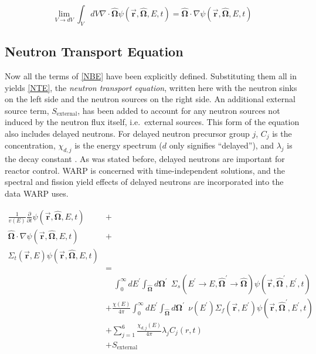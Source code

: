 \begin{equation}
\label{streaming}
 \lim_{V\to dV} \int_V dV \nabla \cdot \boldsymbol{\hat{\Omega}}  \psi(\boldsymbol{\vec{r}},\boldsymbol{\hat{\Omega}},E,t) =  \boldsymbol{\hat{\Omega}}  \cdot \nabla\psi(\boldsymbol{\vec{r}},\boldsymbol{\hat{\Omega}},E,t) 
 \end{equation}
 

\subsection{Neutron Transport Equation}

Now all the terms of \eqref{NBE} have been explicitly defined.  Substituting them all in yields \eqref{NTE}, the \emph{neutron transport equation}, written here with the neutron sinks on the left side and the neutron sources on the right side.  An additional external source term, $S_{\mathrm{external}}$, has been added to account for any neutron sources not induced by the neutron flux itself, i.e.\ external sources.  This form of the equation also includes delayed neutrons.  For delayed neutron precursor group $j$, $C_j$ is the concentration, $\chi_{d,j}$ is the energy spectrum ($d$ only signifies ``delayed''), and $\lambda_j$ is the decay constant \cite{jasmina_book}.  As was stated before, delayed neutrons are important for reactor control.  WARP is concerned with time-independent solutions, and the spectral and fission yield effects of delayed neutrons are incorporated into the data WARP uses.

\begin{equation}
\label{NTE}
\begin{split}
\frac{1}{v(E)} \frac{\partial }{\partial t}\psi(\boldsymbol{\vec{r}},\boldsymbol{\hat{\Omega}},E,t) &+  \\
\boldsymbol{\hat{\Omega}}  \cdot \nabla \psi(\boldsymbol{\vec{r}},\boldsymbol{\hat{\Omega}},E,t) &+ \\
\Sigma_t(\boldsymbol{\vec{r}},E) \psi(\boldsymbol{\vec{r}},\boldsymbol{\hat{\Omega}},E,t) & \\
& =  \\
& \quad \int_0^\infty dE^\prime \int_{\boldsymbol{\hat{\Omega}}} d\boldsymbol{\Omega}^\prime \:\: \Sigma_s(E^\prime \rightarrow E,\boldsymbol{\hat{\Omega}}^\prime \rightarrow \boldsymbol{\hat{\Omega}}) \psi(\boldsymbol{\vec{r}},\boldsymbol{\hat{\Omega}}^\prime,E^\prime,t)    \\
&+ \frac{\chi(E)}{4\pi} \int_0^\infty dE^\prime  \int_{\boldsymbol{\hat{\Omega}}} d\boldsymbol{\Omega}^\prime \:\:  \nu(E^\prime) \Sigma_f(\boldsymbol{\vec{r}},E^\prime) \psi(\boldsymbol{\vec{r}},\boldsymbol{\hat{\Omega}}^\prime,E^\prime,t)  \\
& + \sum_{j=1}^{6}\frac{\chi_{d,j}(E)}{4\pi} \lambda_j C_j(r,t)     \\
& + S_{\mathrm{external}}
\end{split}
 \end{equation}
 
